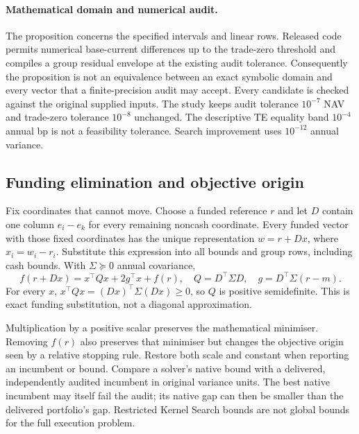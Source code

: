 \documentclass[11pt]{article}
\begin{document}
\paragraph{Mathematical domain and numerical audit.}
The proposition concerns the specified intervals and linear rows. Released
code permits numerical base-current differences up to the trade-zero threshold
and compiles a group residual envelope at the existing audit tolerance.
Consequently the proposition is not an equivalence between an exact symbolic
domain and every vector that a finite-precision audit may accept. Every
candidate is checked against the original supplied inputs. The study keeps
audit tolerance $10^{-7}$ NAV and trade-zero tolerance $10^{-8}$ unchanged.
The descriptive TE equality band $10^{-4}$ annual bp is not a feasibility
tolerance. Search improvement uses $10^{-12}$ annual variance.

\subsection{Funding elimination and objective origin}
Fix coordinates that cannot move. Choose a funded reference $r$ and let $D$
contain one column $e_i-e_k$ for every remaining noncash coordinate. Every
funded vector with those fixed coordinates has the unique representation
$w=r+Dx$, where $x_i=w_i-r_i$. Substitute this expression into all bounds and
group rows, including cash bounds. With $\Sigma\succeq0$ annual covariance,
\begin{equation}\label{eq:funded}
 f(r+Dx)=x^\top Qx+2g^\top x+f(r),\quad
 Q=D^\top\Sigma D,\quad g=D^\top\Sigma(r-m).
\end{equation}
For every $x$, $x^\top Qx=(Dx)^\top\Sigma(Dx)\ge0$, so $Q$ is positive
semidefinite. This is exact funding substitution, not a diagonal approximation.

Multiplication by a positive scalar preserves the mathematical minimiser.
Removing $f(r)$ also preserves that minimiser but changes the objective origin
seen by a relative stopping rule. Restore both scale and constant when reporting
an incumbent or bound. Compare a solver's native bound with a delivered,
independently audited incumbent in original variance units. The best native
incumbent may itself fail the audit; its native gap can then be smaller than
the delivered portfolio's gap. Restricted Kernel Search bounds are not global
bounds for the full execution problem.
\end{document}
